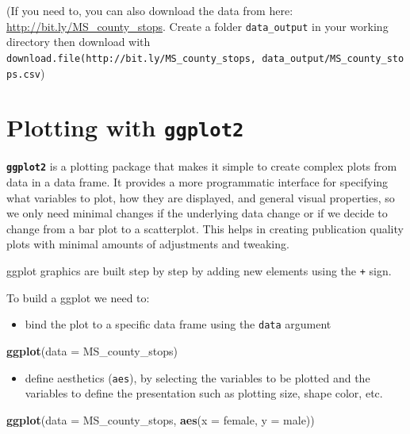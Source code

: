 \documentclass[]{book}
\newenvironment{Shaded}{\begin{snugshade}}{\end{snugshade}}
\newcommand{\DataTypeTok}[1]{\textcolor[rgb]{0.13,0.29,0.53}{#1}}
\newcommand{\KeywordTok}[1]{\textcolor[rgb]{0.13,0.29,0.53}{\textbf{#1}}}
\newcommand{\NormalTok}[1]{#1}
\providecommand{\tightlist}{%
  \setlength{\itemsep}{0pt}\setlength{\parskip}{0pt}}
\begin{document}
(If you need to, you can also download the data from here: \url{http://bit.ly/MS_county_stops}. Create a folder \texttt{data\_output} in your working directory then download with \texttt{download.file(\textquotesingle{}http://bit.ly/MS\_county\_stops\textquotesingle{},\ \textquotesingle{}data\_output/MS\_county\_stops.csv})

\hypertarget{plotting-with-ggplot2}{%
\section{\texorpdfstring{Plotting with \textbf{\texttt{ggplot2}}}{Plotting with ggplot2}}\label{plotting-with-ggplot2}}

\textbf{\texttt{ggplot2}} is a plotting package that makes it simple to create complex plots
from data in a data frame. It provides a more programmatic interface for
specifying what variables to plot, how they are displayed, and general visual
properties, so we only need minimal changes if the underlying data change or if
we decide to change from a bar plot to a scatterplot. This helps in creating
publication quality plots with minimal amounts of adjustments and tweaking.

ggplot graphics are built step by step by adding new elements using the \texttt{+} sign.

To build a ggplot we need to:

\begin{itemize}
\tightlist
\item
  bind the plot to a specific data frame using the \texttt{data} argument
\end{itemize}

\begin{Shaded}
\begin{Highlighting}[]
\KeywordTok{ggplot}\NormalTok{(}\DataTypeTok{data =}\NormalTok{ MS_county_stops)}
\end{Highlighting}
\end{Shaded}

\begin{itemize}
\tightlist
\item
  define aesthetics (\texttt{aes}), by selecting the variables to be plotted and the variables to define the presentation such as plotting size, shape color, etc.
\end{itemize}

\begin{Shaded}
\begin{Highlighting}[]
\KeywordTok{ggplot}\NormalTok{(}\DataTypeTok{data =}\NormalTok{ MS_county_stops, }\KeywordTok{aes}\NormalTok{(}\DataTypeTok{x =}\NormalTok{ female, }\DataTypeTok{y =}\NormalTok{ male))}
\end{Highlighting}
\end{Shaded}
\end{document}
